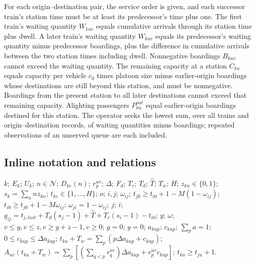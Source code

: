 \documentclass[10pt]{article}
\begin{document}
For each origin--destination pair, the service order is given, and each successor train's station time must be at least its predecessor's time plus one. The first train's waiting quantity $W_{1uv}$ equals cumulative arrivals through its station time plus dwell. A later train's waiting quantity $W_{kuv}$ equals its predecessor's waiting quantity minus predecessor boardings, plus the difference in cumulative arrivals between the two station times including dwell. Nonnegative boardings $B_{kuv}$ cannot exceed the waiting quantity. The remaining capacity at a station $C_{ku}$ equals capacity per vehicle $c_0$ times platoon size minus earlier-origin boardings whose destinations are still beyond this station, and must be nonnegative. Boardings from the present station to all later destinations cannot exceed that remaining capacity. Alighting passengers $P^{out}_{ku}$ equal earlier-origin boardings destined for this station. The operator seeks the lowest sum, over all trains and origin--destination records, of waiting quantities minus boardings; repeated observations of an unserved queue are each included.

\subsection*{Inline notation and relations}
$k$; $E_k$; $U_k$; $n\in\mathcal N$; $D_{ke}(n)$; $r^{uv}_p$; $\Delta$; $F_d$; $T_c$; $T_d$; $\hat T$; $T_w$; $H$; $z_{kn}\in\{0,1\}$; $s_k=\sum_nn z_{kn}$; $t_{ke}\in\{1,\ldots,H\}$; $o$; $i,j$; $\omega_{ij}$; $t_{j0}\ge t_{i0}+1-M(1-\omega_{ij})$; $t_{i0}\ge t_{j0}+1-M\omega_{ij}$; $\omega_{ji}=1-\omega_{ij}$; $j$; $i$; $g_{ij}=t_{j,last}+T_d(s_j-1)+\hat T+T_c(s_i-1)-t_{i0}$; $y$; $\omega$; $v\le y,v\le z,v\ge y+z-1,v\ge0$; $g=0$; $y=0$; $a_{kup}$; $c_{kup}$; $\sum_pa=1$; $0\le c_{kup}\le\Delta a_{kup}$; $t_{ku}+T_w=\sum_p(p\Delta a_{kup}+c_{kup})$; $A_{uv}(t_{ku}+T_w)=\sum_p[(\sum_{q<p}r_q^{uv})\Delta a_{kup}+r_p^{uv}c_{kup}]$; $t_{ku}\ge t_{ju}+1$.
\end{document}
